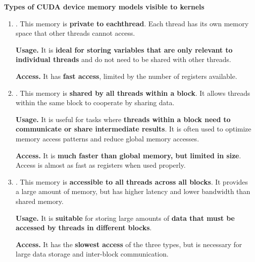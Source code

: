 \begin{flushleft}
    \textcolor{Green3}{ \textbf{Types of CUDA device memory models visible to kernels}}
\end{flushleft}
\begin{enumerate}
    \item {}. This memory is \textbf{private to each}\break \textbf{thread}. Each thread has its own memory space that other threads cannot access.
    
    \textcolor{Green3}{ \textbf{Usage.}} It is \textbf{ideal for storing variables that are only relevant to individual threads} and do not need to be shared with other threads.
    
    \textcolor{Green3}{ \textbf{Access.}} It has \textbf{fast access}, limited by the number of registers available.


    \item {}. This memory is \textbf{shared by all threads within a block}. It allows threads within the same block to cooperate by sharing data.
    
    \textcolor{Green3}{ \textbf{Usage.}} It is useful for tasks where \textbf{threads within a block need to communicate or share intermediate results}. It is often used to optimize memory access patterns and reduce global memory accesses.
    
    \textcolor{Green3}{ \textbf{Access.}} It is \textbf{much faster than global memory, but limited in size}. Access is almost as fast as registers when used properly.


    \item {}. This memory is \textbf{accessible to all threads across all blocks}. It provides a large amount of memory, but has higher latency and lower bandwidth than shared memory.
    
    \textcolor{Green3}{ \textbf{Usage.}} It is \textbf{suitable} for storing large amounts of \textbf{data that must be accessed by threads in different blocks}.
    
    \textcolor{Green3}{ \textbf{Access.}} It has the \textbf{slowest access} of the three types, but is necessary for large data storage and inter-block communication.
\end{enumerate}